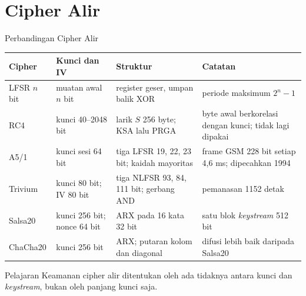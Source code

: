 \documentclass[aspectratio=169,11pt]{beamer}
\begin{document}
\section{Cipher Alir}

\begin{frame}{Perbandingan Cipher Alir}
    \scriptsize
    \vspace{-0.06cm}
    \renewcommand{\arraystretch}{0.94}
    \begin{tabularx}{\linewidth}{@{}>{\raggedright\arraybackslash}p{1.8cm} >{\raggedright\arraybackslash}p{3.7cm} >{\raggedright\arraybackslash}p{4.4cm} >{\raggedright\arraybackslash}X@{}}
        \toprule
        \textbf{Cipher} & \textbf{Kunci dan IV} & \textbf{Struktur} & \textbf{Catatan} \\
        \midrule
        LFSR $n$ bit & muatan awal $n$ bit & register geser, umpan balik XOR & periode maksimum $2^n-1$ \\
        \addlinespace[0pt]
        RC4 & kunci 40--2048 bit & larik $S$ 256 byte; KSA lalu PRGA & byte awal berkorelasi dengan kunci; tidak lagi dipakai \\
        \addlinespace[0pt]
        A5/1 & kunci sesi 64 bit & tiga LFSR 19, 22, 23 bit; kaidah mayoritas & frame GSM 228 bit setiap 4,6 ms; dipecahkan 1994 \\
        \addlinespace[0pt]
        Trivium & kunci 80 bit; IV 80 bit & tiga NLFSR 93, 84, 111 bit; gerbang AND & pemanasan 1152 detak \\
        \addlinespace[0pt]
        Salsa20 & kunci 256 bit; nonce 64 bit & ARX pada 16 kata 32 bit & satu blok \textit{keystream} 512 bit \\
        \addlinespace[0pt]
        ChaCha20 & kunci 256 bit & ARX; putaran kolom dan diagonal & difusi lebih baik daripada Salsa20 \\
        \bottomrule
    \end{tabularx}
    \vspace{0.08cm}
    \begin{block}{Pelajaran}
        \footnotesize
        Keamanan cipher alir ditentukan oleh ada tidaknya  antara kunci dan \textit{keystream}, bukan oleh panjang
        kunci saja.
    \end{block}
\end{frame}
\end{document}
